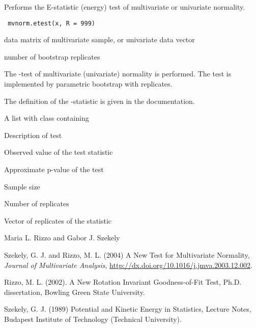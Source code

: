 \begin{Description}\relax
Performs the E-statistic (energy) test of multivariate or univariate normality.
\end{Description}
\begin{Usage}
\begin{verbatim}
 mvnorm.etest(x, R = 999)
\end{verbatim}
\end{Usage}
\begin{Arguments}
\begin{ldescription}
\item[\code{x}] data matrix of multivariate sample, or univariate data vector
\item[\code{R}] number of bootstrap replicates 
\end{ldescription}
\end{Arguments}
\begin{Details}\relax
The -test of multivariate (univariate) normality
is performed. The test is implemented by parametric bootstrap with 
 replicates. 

The definition of the -statistic is given in the 
 documentation.\end{Details}
\begin{Value}
A list with class  containing
\begin{ldescription}
\item[\code{method}] Description of test
\item[\code{statistic}] Observed value of the test statistic
\item[\code{p.value}] Approximate p-value of the test
\item[\code{n}] Sample size
\item[\code{R}] Number of replicates
\item[\code{replicates}] Vector of replicates of the statistic
\end{ldescription}
\end{Value}
\begin{Author}\relax
Maria L. Rizzo  and
Gabor J. Szekely 
\end{Author}
\begin{References}\relax
Szekely, G. J. and Rizzo, M. L. (2004) A New Test for 
Multivariate Normality, \emph{Journal of Multivariate Analysis},
\url{http://dx.doi.org/10.1016/j.jmva.2003.12.002}.

Rizzo, M. L. (2002). A New Rotation Invariant Goodness-of-Fit Test,
Ph.D. dissertation, Bowling Green State University.

Szekely, G. J. (1989) Potential and Kinetic Energy in Statistics, 
Lecture Notes, Budapest Institute of Technology (Technical University).\end{References}
